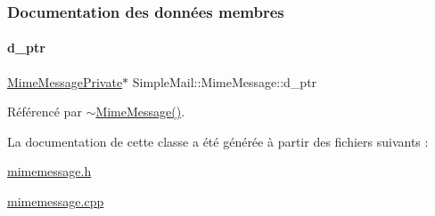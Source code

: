 \subsubsection{Documentation des données membres}
\mbox{\label{class_simple_mail_1_1_mime_message_abb70ca7430a820f75203dd6bd66cc47f}} 
\paragraph{\texorpdfstring{d\+\_\+ptr}{d\_ptr}}
{\footnotesize\ttfamily \hyperlink{class_simple_mail_1_1_mime_message_private}{Mime\+Message\+Private}$\ast$ Simple\+Mail\+::\+Mime\+Message\+::d\+\_\+ptr\hspace{0.3cm}{\ttfamily [protected]}}



Référencé par \hyperlink{class_simple_mail_1_1_mime_message_ae5005458f2bf64ad5255b8d12e0a324c}{$\sim$\+Mime\+Message()}.



La documentation de cette classe a été générée à partir des fichiers suivants \+:\begin{DoxyCompactItemize}
\item 
\hyperlink{mimemessage_8h}{mimemessage.\+h}\item 
\hyperlink{mimemessage_8cpp}{mimemessage.\+cpp}\end{DoxyCompactItemize}
